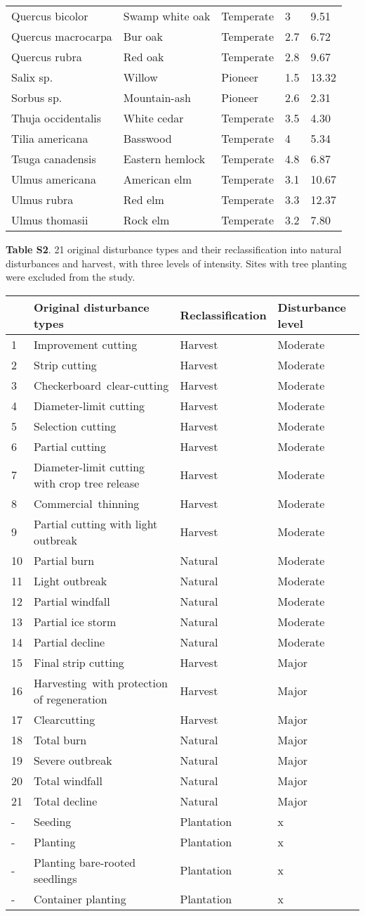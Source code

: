\documentclass[
]{article}
\begin{document}
\begin{longtable}[]{@{}lllll@{}}
Quercus bicolor & Swamp white oak & Temperate & 3 & 9.51\tabularnewline
Quercus macrocarpa & Bur oak & Temperate & 2.7 & 6.72\tabularnewline
Quercus rubra & Red oak & Temperate & 2.8 & 9.67\tabularnewline
Salix sp. & Willow & Pioneer & 1.5 & 13.32\tabularnewline
Sorbus sp. & Mountain-ash & Pioneer & 2.6 & 2.31\tabularnewline
Thuja occidentalis & White cedar & Temperate & 3.5 & 4.30\tabularnewline
Tilia americana & Basswood & Temperate & 4 & 5.34\tabularnewline
Tsuga canadensis & Eastern hemlock & Temperate & 4.8 &
6.87\tabularnewline
Ulmus americana & American elm & Temperate & 3.1 & 10.67\tabularnewline
Ulmus rubra & Red elm & Temperate & 3.3 & 12.37\tabularnewline
Ulmus thomasii & Rock elm & Temperate & 3.2 & 7.80\tabularnewline
\bottomrule
\end{longtable}

\pagebreak

\textbf{Table S2}. 21 original disturbance types and their
reclassification into natural disturbances and harvest, with three
levels of intensity. Sites with tree planting were excluded from the
study.

\begin{longtable}[]{@{}llll@{}}
\toprule
& Original disturbance types & Reclassification & Disturbance
level\tabularnewline
\midrule
\endhead
1 & Improvement cutting & Harvest & Moderate\tabularnewline
2 & Strip cutting & Harvest & Moderate\tabularnewline
3 & Checkerboard~clear-cutting & Harvest & Moderate\tabularnewline
4 & Diameter-limit cutting & Harvest & Moderate\tabularnewline
5 & Selection cutting & Harvest & Moderate\tabularnewline
6 & Partial cutting & Harvest & Moderate\tabularnewline
7 & Diameter-limit cutting with crop tree release & Harvest &
Moderate\tabularnewline
8 & Commercial~thinning & Harvest & Moderate\tabularnewline
9 & Partial cutting with light outbreak & Harvest &
Moderate\tabularnewline
10 & Partial burn & Natural & Moderate\tabularnewline
11 & Light outbreak & Natural & Moderate\tabularnewline
12 & Partial windfall & Natural & Moderate\tabularnewline
13 & Partial ice storm & Natural & Moderate\tabularnewline
14 & Partial decline & Natural & Moderate\tabularnewline
15 & Final strip cutting & Harvest & Major\tabularnewline
16 & Harvesting~with protection of regeneration & Harvest &
Major\tabularnewline
17 & Clearcutting & Harvest & Major\tabularnewline
18 & Total burn & Natural & Major\tabularnewline
19 & Severe outbreak & Natural & Major\tabularnewline
20 & Total windfall & Natural & Major\tabularnewline
21 & Total decline & Natural & Major\tabularnewline
- & Seeding & Plantation & x\tabularnewline
- & Planting & Plantation & x\tabularnewline
- & Planting bare-rooted seedlings & Plantation & x\tabularnewline
- & Container planting & Plantation & x\tabularnewline
\bottomrule
\end{longtable}
\end{document}
